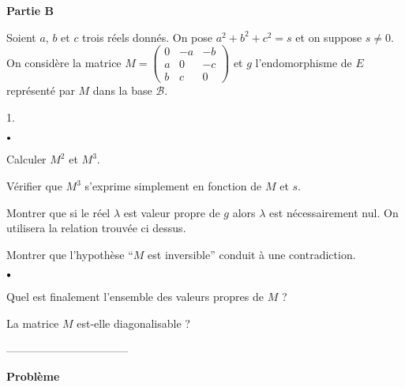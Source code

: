 \documentclass[11pt]{article}%
\begin{document}
\textbf{Partie B}

\noindent Soient $a$, $b$ et $c$ trois réels donnés. On pose $a^{2} +
b^{2} + c^{2} = s$ et on suppose $s \neq0$.\\
On considère la matrice $M = \left( 
\begin{array}{lll}
0 & -a & -b \\
a & 0 & -c \\
b & c & 0
\end{array}
\right)$ et $g$ l'endomorphisme de $E$ représenté par $M$ dans la base
$\mathcal{B}$.

\begin{noliste}{1.}
 \setlength{\itemsep}{4mm}
\item[ \ \textbf{1)}] 

\begin{noliste}{$\scriptstyle \bullet$}
\item[ \ \textbf{a :}] Calculer $M^{2}$ et $M^{3}$.

\item[ \ \textbf{b :}] Vérifier que $M^{3}$ s'exprime simplement en
fonction
de $M$ et $s$.
\end{noliste}

\item[ \ \textbf{2)}] Montrer que si le réel $\lambda $ est valeur
propre
de $g$ alors $\lambda $ est nécessairement nul. On utilisera la
relation
trouvée ci dessus.

\item[ \ \textbf{3)}] Montrer que l'hypothèse ``$M$ est inversible''
conduit à une contradiction.

\item[ \ \textbf{4)}] 

\begin{noliste}{$\scriptstyle \bullet$}
\item[ \ \textbf{a :}] Quel est finalement l'ensemble des valeurs
propres de $M$
 ?

\item[ \ \textbf{b :}] La matrice $M$ est-elle diagonalisable ?
\end{noliste}
\end{noliste}

\vspace{2cm} 
---------------------------------
\centerline{\bf Problème}
\end{document}
